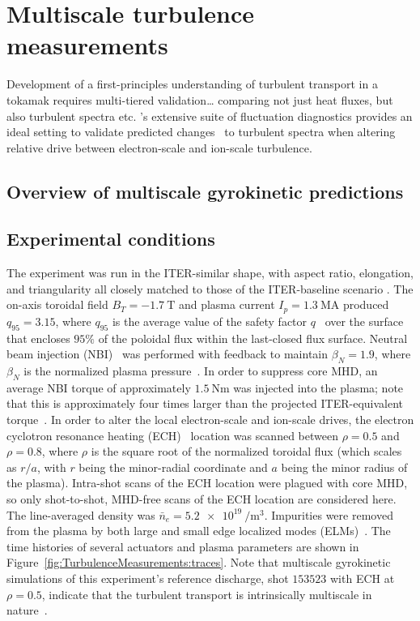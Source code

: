 \chapter{Multiscale turbulence measurements}
\label{ch:TurbulenceMeasurements}
Development of a first-principles understanding
of turbulent transport in a tokamak
requires multi-tiered validation\ldots
comparing not just heat fluxes, but
also turbulent spectra etc.
\diiid's extensive suite of fluctuation diagnostics
provides an ideal setting to validate
predicted changes~\cite{howard_pp16}
to turbulent spectra when altering relative drive
between electron-scale and ion-scale turbulence.


\section{Overview of multiscale gyrokinetic predictions}


\section{Experimental conditions}
\label{sec:TurbulenceMeasurements:ExperimentalConditions}
The experiment was run in the ITER-similar shape,
with aspect ratio, elongation, and triangularity
all closely matched to those of the ITER-baseline scenario
\cite[Sec.~13.5 \& 13.6]{wesson}.
The on-axis toroidal field $B_T = \SI{-1.7}{\tesla}$ and
plasma current $I_p = \SI{1.3}{\mega\ampere}$
produced $q_{95} = 3.15$,
where $q_{95}$ is the average value
of the safety factor $q$~\cite[Sec.~3.4]{wesson}
over the surface that encloses $95\%$
of the poloidal flux within the last-closed flux surface.
Neutral beam injection (NBI)~\cite[Sec.~5.3-5.5]{wesson}
was performed with feedback to maintain
$\beta_N = 1.9$, where
$\beta_N$ is the normalized plasma pressure~\cite[Sec.~6.18]{wesson}.
In order to suppress core MHD,
an average NBI torque of approximately $\SI{1.5}{\newton \meter}$
was injected into the plasma;
note that this is approximately four times larger than
the projected ITER-equivalent torque~\cite{garofalo_nf11}.
In order to alter the local electron-scale and ion-scale drives,
the electron cyclotron resonance heating (ECH)~\cite[Sec.~5.10]{wesson}
location was scanned between $\rho = 0.5$ and $\rho = 0.8$,
where $\rho$ is the square root of the normalized toroidal flux
(which scales as $r / a$, with
$r$ being the minor-radial coordinate and
$a$ being the minor radius of the plasma).
Intra-shot scans of the ECH location
were plagued with core MHD, so
only shot-to-shot, MHD-free scans of the ECH location
are considered here.
The line-averaged density was
$\bar{n}_e = \SI{5.2e19}{\per\meter\cubed}$.
Impurities were removed from the plasma
by both large and small edge localized modes (ELMs)~\cite[Sec.~7.17]{wesson}.
The time histories of several actuators and plasma parameters
are shown in Figure~\ref{fig:TurbulenceMeasurements:traces}.
Note that multiscale gyrokinetic simulations
of this experiment's reference discharge,
\diiid\space shot $153523$ with ECH at $\rho = 0.5$,
indicate that the turbulent transport
is intrinsically multiscale in nature~\cite{holland_nf17}.

